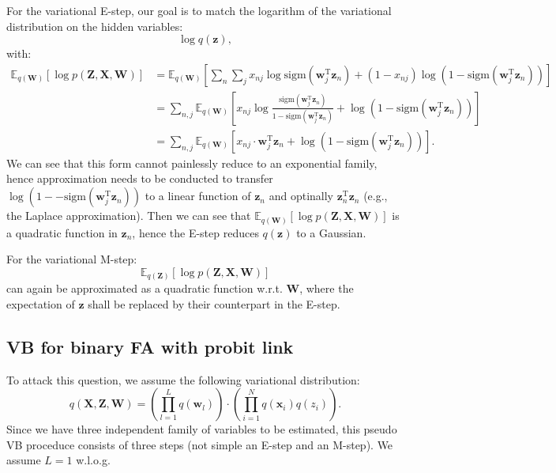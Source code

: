 \documentclass[UTF8]{ctexart}
\begin{document}
For the variational E-step, our goal is to match the logarithm of the variational distribution on the hidden variables:
$$\log q(\textbf{z}),$$
with:
$$
\begin{aligned}
\mathbb{E}_{q(\textbf{W})}\left[\log p(\textbf{Z},\textbf{X},\textbf{W}) \right]&= \mathbb{E}_{q(\textbf{W})}\left[\sum_{n}\sum_{j}x_{nj}\log\text{sigm}(\textbf{w}_{j}^{\text{T}}\textbf{z}_{n})+(1-x_{nj})\log (1-\text{sigm}(\textbf{w}_{j}^{\text{T}}\textbf{z}_{n})) \right]\\
&=\sum_{n,j}\mathbb{E}_{q(\textbf{W})}\left[x_{nj}\log \frac{\text{sigm}(\textbf{w}_{j}^{\text{T}}\textbf{z}_{n})}{1-\text{sigm}(\textbf{w}_{j}^{\text{T}}\textbf{z}_{n})}+\log (1-\text{sigm}(\textbf{w}_{j}^{\text{T}}\textbf{z}_{n})) \right]\\
&=\sum_{n,j}\mathbb{E}_{q(\textbf{W})}\left[x_{nj}\cdot\textbf{w}_{j}^{\text{T}}\textbf{z}_{n}+\log (1-\text{sigm}(\textbf{w}_{j}^{\text{T}}\textbf{z}_{n})) \right].
\end{aligned}
$$
We can see that this form cannot painlessly reduce to an exponential family, hence approximation needs to be conducted to transfer $\log (1--\text{sigm}(\textbf{w}_{j}^{\text{T}}\textbf{z}_{n}))$ to a linear function of $\textbf{z}_{n}$ and optinally $\textbf{z}_{n}^{\text{T}}\textbf{z}_{n}$ (e.g., the Laplace approximation).
Then we can see that $\mathbb{E}_{q(\textbf{W})}\left[\log p(\textbf{Z},\textbf{X},\textbf{W}) \right]$ is a quadratic function in $\textbf{z}_{n}$, hence the E-step reduces $q(\textbf{z})$ to a Gaussian.

For the variational M-step:
$$\mathbb{E}_{q(\textbf{Z})}[\log p(\textbf{Z},\textbf{X},\textbf{W})]$$
can again be approximated as a quadratic function w.r.t. $\textbf{W}$, where the expectation of $\textbf{z}$ shall be replaced by their counterpart in the E-step. 

\subsection{VB for binary FA with probit link}
To attack this question, we assume the following variational distribution:
$$q(\textbf{X},\textbf{Z},\textbf{W})=\left(\prod_{l=1}^{L}q(\textbf{w}_{l})\right)\cdot\left(\prod_{i=1}^{N}q(\textbf{x}_{i})q(z_{i})\right).$$
Since we have three independent family of variables to be estimated, this pseudo VB proceduce consists of three steps (not simple an E-step and an M-step).
We assume $L=1$ w.l.o.g. 
\end{document}
